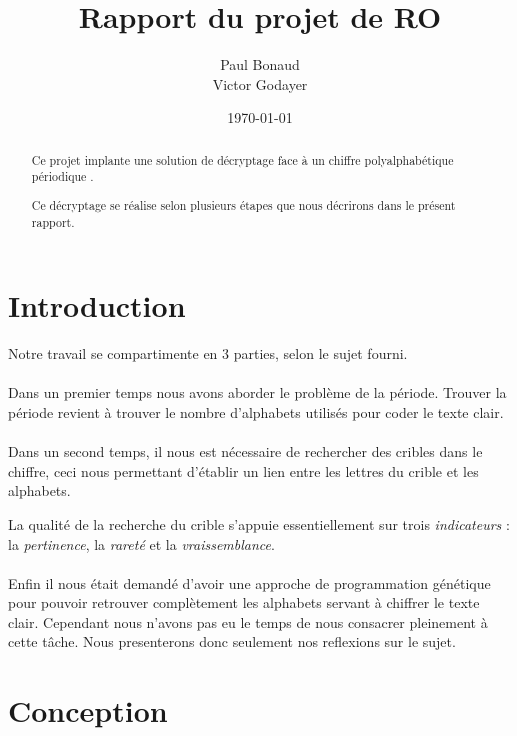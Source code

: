 \documentclass[a4paper, 11pt]{article}
\begin{document}
\title{Rapport du projet de RO}
\author{Paul Bonaud\\
  Victor Godayer}
\date\today

\maketitle

\begin{abstract}
  Ce projet implante une solution de décryptage face à un chiffre
  polyalphabétique périodique .

  Ce décryptage se réalise selon plusieurs étapes que nous décrirons
  dans le présent rapport.
\end{abstract}
\newpage
\tableofcontents
\newpage


\section{Introduction}
Notre travail se compartimente en 3 parties, selon le sujet fourni.

\paragraph{}
Dans un premier temps nous avons aborder le problème de la période.
Trouver la période revient à trouver le nombre d'alphabets utilisés pour
coder le texte clair.

\paragraph{}
Dans un second temps, il nous est nécessaire de rechercher des cribles
dans le chiffre, ceci nous permettant d'établir un lien entre les
lettres du crible et les alphabets.

La qualité de la recherche du crible s'appuie essentiellement sur
trois \textit{indicateurs} : la \textit{pertinence}, la
\textit{rareté} et la \textit{vraissemblance}.

\paragraph{}
Enfin il nous était demandé d'avoir une approche de programmation génétique pour
pouvoir retrouver complètement les alphabets servant à chiffrer le
texte clair. Cependant nous n'avons pas eu le temps de nous consacrer
pleinement à cette tâche. Nous presenterons donc seulement nos
reflexions sur le sujet.


\section{Conception}
\end{document}
